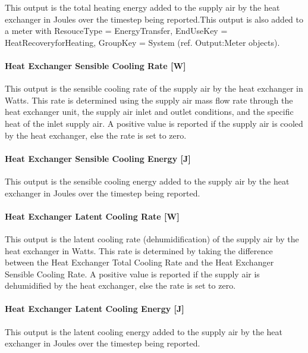 This output is the total heating energy added to the supply air by the heat exchanger in Joules over the timestep being reported.This output is also added to a meter with ResouceType = EnergyTransfer, EndUseKey = HeatRecoveryforHeating, GroupKey = System (ref. Output:Meter objects).

\paragraph{Heat Exchanger Sensible Cooling Rate {[}W{]}}\label{heat-exchanger-sensible-cooling-rate-w-1}

This output is the sensible cooling rate of the supply air by the heat exchanger in Watts. This rate is determined using the supply air mass flow rate through the heat exchanger unit, the supply air inlet and outlet conditions, and the specific heat of the inlet supply air. A positive value is reported if the supply air is cooled by the heat exchanger, else the rate is set to zero.

\paragraph{Heat Exchanger Sensible Cooling Energy {[}J{]}}\label{heat-exchanger-sensible-cooling-energy-j-1}

This output is the sensible cooling energy added to the supply air by the heat exchanger in Joules over the timestep being reported.

\paragraph{Heat Exchanger Latent Cooling Rate {[}W{]}}\label{heat-exchanger-latent-cooling-rate-w-1}

This output is the latent cooling rate (dehumidification) of the supply air by the heat exchanger in Watts. This rate is determined by taking the difference between the Heat Exchanger Total Cooling Rate and the Heat Exchanger Sensible Cooling Rate. A positive value is reported if the supply air is dehumidified by the heat exchanger, else the rate is set to zero.

\paragraph{Heat Exchanger Latent Cooling Energy {[}J{]}}\label{heat-exchanger-latent-cooling-energy-j-1}

This output is the latent cooling energy added to the supply air by the heat exchanger in Joules over the timestep being reported.


